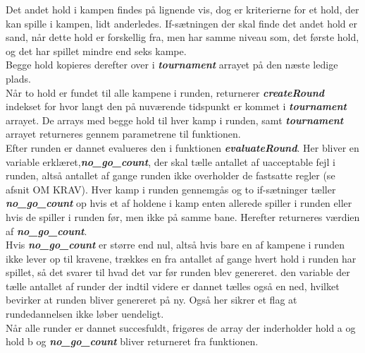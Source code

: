 Det andet hold i kampen findes på lignende vis, dog er kriterierne for et hold, der kan spille i kampen, lidt anderledes. If-sætningen der skal finde det andet hold er sand, når dette hold er forskellig fra, men har samme niveau som, det første hold, og det har spillet mindre end seks kampe.\\
Begge hold kopieres derefter over i \textbf{\textit{tournament}} arrayet på den næste ledige plads. \\
Når to hold er fundet til alle kampene i runden, returnerer \textbf{\textit{createRound}} indekset for hvor langt den på nuværende tidspunkt er kommet i \textbf{\textit{tournament}} arrayet. De arrays med begge hold til hver kamp i runden, samt \textbf{\textit{tournament}} arrayet returneres gennem parametrene til funktionen. \\
Efter runden er dannet evalueres den i funktionen \textbf{\textit{evaluateRound}}. Her bliver en variable erklæret,\textbf{\textit{no\_go\_count}}, der skal tælle antallet af uacceptable fejl i runden, altså antallet af gange runden ikke overholder de fastsatte regler (se afsnit OM KRAV). Hver kamp i runden gennemgås og to if-sætninger tæller \textbf{\textit{no\_go\_count}} op hvis et af holdene i kamp enten allerede spiller i runden eller hvis de spiller i runden før, men ikke på samme bane. Herefter returneres værdien af \textbf{\textit{no\_go\_count}}. \\
Hvis \textbf{\textit{no\_go\_count}} er større end nul, altså hvis bare en af kampene i runden ikke lever op til kravene, trækkes en fra antallet af gange hvert hold i runden har spillet, så det svarer til hvad det var før runden blev genereret. den variable der tælle antallet af runder der indtil videre er dannet tælles også en ned, hvilket bevirker at runden bliver genereret på ny. Også her sikrer et flag at rundedannelsen ikke løber uendeligt. \\
Når alle runder er dannet succesfuldt, frigøres de array der inderholder hold a og hold b og \textbf{\textit{no\_go\_count}} bliver returneret fra funktionen. 

